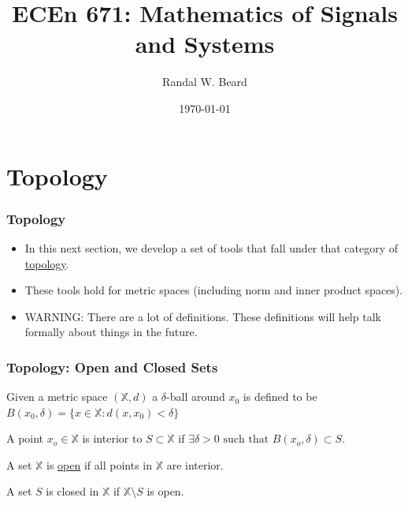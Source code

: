 \documentclass{beamer}
\title{ECEn 671: Mathematics of Signals and Systems}
\author{Randal W. Beard}
\institute{Brigham Young University}
\date{\today}
\begin{document}
\begin{frame}
	\titlepage
\end{frame}



\section{Topology}
\frame{\sectionpage}

\begin{frame}\frametitle{Topology}

\begin{itemize}
\item In this next section, we develop a set of tools that fall under that category of \underline{topology}.  
\item These tools hold for metric spaces (including norm and inner product spaces).
\item WARNING:  There are a lot of definitions.  These definitions will help talk formally about things in the future.
\end{itemize}
\end{frame}

\begin{frame}\frametitle{Topology: Open and Closed Sets}

\begin{definition}[Ball] Given a metric space $(\mathbb{X},d)$ a $\delta$-ball around $x_0$ is defined to be
\(
B(x_0,\delta) = \{ x \in \mathbb{X} : d(x,x_0) < \delta \}
\)
\end{definition}
\begin{definition}
 A point $x_o \in \mathbb{X}$ is interior to $S \subset \mathbb{X}$ if 
\(
\exists \delta > 0 \text{ such that } B(x_o,\delta) \subset S.
\)
\end{definition}
\begin{definition} A set $\mathbb{X}$ is \underline{open} if all points in $\mathbb{X}$ are interior.	
\end{definition}

\begin{definition} A set $S$ is closed in $\mathbb{X}$ if $\mathbb{X}\setminus S$ is open.	
\end{definition}

\end{frame}
\end{document}
